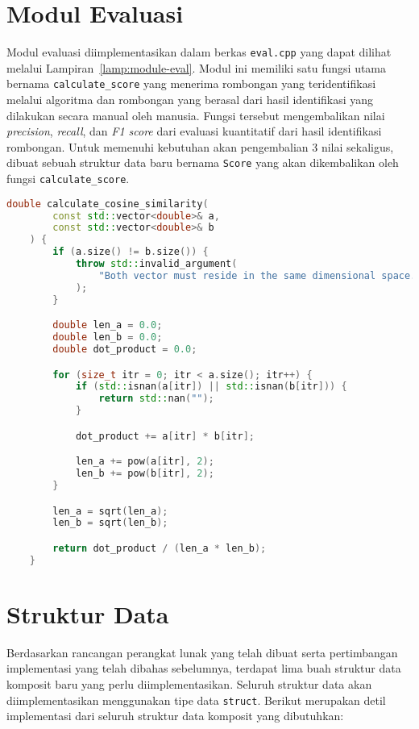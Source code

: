 \section{Modul Evaluasi}
\label{sec:impl-eval}

Modul evaluasi diimplementasikan dalam berkas \texttt{eval.cpp} yang dapat dilihat melalui Lampiran~\ref{lamp:module-eval}. Modul ini memiliki satu fungsi utama bernama \texttt{calculate\_score} yang menerima rombongan yang teridentifikasi melalui algoritma dan rombongan yang berasal dari hasil identifikasi yang dilakukan secara manual oleh manusia. Fungsi tersebut mengembalikan nilai \textit{precision}, \textit{recall}, dan \textit{F1 score} dari evaluasi kuantitatif dari hasil identifikasi rombongan. Untuk memenuhi kebutuhan akan pengembalian 3 nilai sekaligus, dibuat sebuah struktur data baru bernama \texttt{Score} yang akan dikembalikan oleh fungsi \texttt{calculate\_score}.

\begin{lstlisting}[language=C++, caption=Implementasi fungsi \texttt{calculate\_cosine\_similarity}, label={bab5:cosine-similarity}]
    double calculate_cosine_similarity(
        const std::vector<double>& a,
        const std::vector<double>& b
    ) {
        if (a.size() != b.size()) {
            throw std::invalid_argument(
                "Both vector must reside in the same dimensional space."
            );
        }

        double len_a = 0.0;
        double len_b = 0.0;
        double dot_product = 0.0;

        for (size_t itr = 0; itr < a.size(); itr++) {
            if (std::isnan(a[itr]) || std::isnan(b[itr])) {
                return std::nan("");
            }

            dot_product += a[itr] * b[itr];

            len_a += pow(a[itr], 2);
            len_b += pow(b[itr], 2);
        }

        len_a = sqrt(len_a);
        len_b = sqrt(len_b);

        return dot_product / (len_a * len_b);
    }
\end{lstlisting}

\section{Struktur Data}
\label{sec:impl-struct}

Berdasarkan rancangan perangkat lunak yang telah dibuat serta pertimbangan implementasi yang telah dibahas sebelumnya, terdapat lima buah struktur data komposit baru yang perlu diimplementasikan. Seluruh struktur data akan diimplementasikan menggunakan tipe data \texttt{struct}. Berikut merupakan detil implementasi dari seluruh struktur data komposit yang dibutuhkan:

